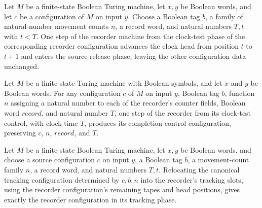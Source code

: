 \begin{lemma}
\label{Complexity.clRec_tick}
\leanok
{}
Let $M$ be a finite-state Boolean Turing machine, let $x,y$ be Boolean words, and let
$c$ be a configuration of $M$ on input $y$. Choose a Boolean tag $b$, a family of
natural-number movement counts $n$, a record word, and natural numbers $T,t$ with $t<T$.
One step of the recorder machine from the clock-test phase of the corresponding recorder
configuration advances the clock head from position $t$ to $t+1$ and enters the
source-release phase, leaving the other configuration data unchanged.
\end{lemma}

\begin{lemma}
\label{Complexity.clRec_stop}
\leanok
{}
Let $M$ be a finite-state Turing machine with Boolean symbols, and let $x$ and $y$ be
Boolean words. For any configuration $c$ of $M$ on input $y$, Boolean tag $b$, function
$n$ assigning a natural number to each of the recorder’s counter fields, Boolean word
$record$, and natural number $T$, one step of the recorder from its clock-test control,
with clock time $T$, produces its completion control configuration, preserving $c$, $n$,
$record$, and $T$.
\end{lemma}

\begin{lemma}
\label{Complexity.clRec_track_frame}
\leanok
{}
Let $M$ be a finite-state Boolean Turing machine, let $x,y$ be Boolean words, and choose
a source configuration $c$ on input $y$, a Boolean tag $b$, a movement-count family $n$,
a record word, and natural numbers $T,t$. Relocating the canonical tracking
configuration determined by $c,b,n$ into the recorder's tracking slots, using the
recorder configuration's remaining tapes and head positions, gives exactly the recorder
configuration in its tracking phase.
\end{lemma}

